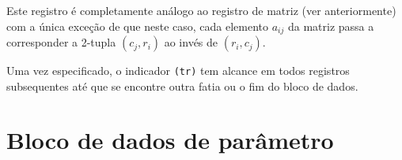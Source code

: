 \documentclass[11pt, brazil]{report}
\begin{document}
Este registro é completamente análogo ao registro de matriz (ver
anteriormente) com a única exceção de que neste caso, cada elemento $a_{ij}$ da
matriz passa a corresponder a 2-tupla $(c_j,r_i)$ ao invés de $(r_i,c_j)$.

Uma vez especificado, o indicador {\tt(tr)} tem alcance em todos registros
subsequentes até que se encontre outra fatia ou o fim do bloco de dados.


%
%

\section{Bloco de dados de parâmetro}

\noindent
{}
\end{document}
